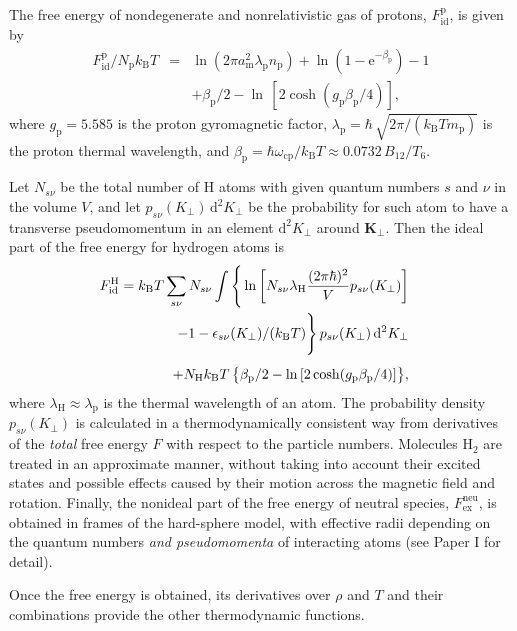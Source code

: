 \documentclass{emulateapj}
\newcommand{\bea}{\begin{eqnarray}}
\newcommand{\eea}{\end{eqnarray}}
\newcommand{\mpr}{m_\mathrm{p}}
\newcommand{\am}{a_\mathrm{m}}
\newcommand{\omp}{\omega_\mathrm{cp}}
\newcommand{\kB}{k_\mathrm{B}}
\begin{document}
The free energy of nondegenerate and nonrelativistic
gas of protons, $F_\mathrm{id}^\mathrm{p}$,
is given by
\bea
   F_\mathrm{id}^\mathrm{p} / N_\mathrm{p} \kB T &=&
      \ln(2\pi \am^2\lambda_\mathrm{p} n_\mathrm{p})
    + \ln\left(1-\mathrm{e}^{-\beta_\mathrm{p}}\right)-1
 \nonumber\\&&
   +  \beta_\mathrm{p}/2
    - \ln\,[2\cosh( g_\mathrm{p}\beta_\mathrm{p}/4)] ,
 \eea
 where $g_\mathrm{p}=5.585$
is the proton gyromagnetic factor,
 $\lambda_\mathrm{p}=\hbar\,\sqrt{2\pi/(k_\mathrm{B}T \mpr)}$ 
is the proton thermal wavelength, and
$\beta_\mathrm{p} = \hbar\omp / \kB T
  \approx 0.0732\,B_{12}/T_6$.

Let $N_{s\nu}$ be the total number of H atoms with given 
quantum numbers $s$ and $\nu$ in the volume $V$,
and let $p_{s\nu}(K_\perp)\,\mathrm{d}^2 K_\perp$ be the
probability for such atom to have
a transverse pseudomomentum in an element $\mathrm{d}^2 K_\perp$
around $\bm{K}_\perp$. 
Then the ideal part of the free energy for hydrogen atoms
is 
\bea
&&\hspace*{-2em}
   F_\mathrm{id}^\mathrm{H} = k_\mathrm{B} T \sum_{s\nu} N_{s\nu}
    \int \Bigg\{
\ln\left[N_{s\nu} \lambda_\mathrm{H} {(2\pi\hbar)^2 \over V}
p_{s\nu}(K_\perp) \right]
 \nonumber\\&&
        - 1 - \epsilon_{s\nu}(K_\perp)/(k_\mathrm{B} T) \Bigg\}
       \, p_{s\nu}(K_\perp)\,\mathrm{d}^2 K_\perp
\nonumber\\[1ex]&&
   + N_\mathrm{H} \kB T \,\big\{ \beta_\mathrm{p}/2
    - \ln\,[2\cosh( g_\mathrm{p}\beta_\mathrm{p}/4)] \big\} ,
\label{FH1}
\eea
where $\lambda_\mathrm{H}\approx\lambda_\mathrm{p}$ 
is the thermal wavelength of an atom.
The probability density $p_{s\nu}(K_\perp)$ is calculated
in a thermodynamically consistent way 
from derivatives of the \emph{total} free energy $F$
with respect to the particle numbers. 
Molecules H$_2$ are treated in an approximate manner,
without taking into account their excited states and possible 
effects caused by their motion across the magnetic field
and rotation.
Finally, the nonideal part of the free energy of neutral
species, $F_\mathrm{ex}^\mathrm{neu}$, is obtained in frames of
the hard-sphere model, with effective radii depending on
the quantum numbers \emph{and pseudomomenta} of interacting
atoms (see Paper I for detail).

Once the free energy is obtained, its derivatives 
over $\rho$ and $T$ and their combinations provide
the other thermodynamic functions.

\vspace*{5ex}
\end{document}
